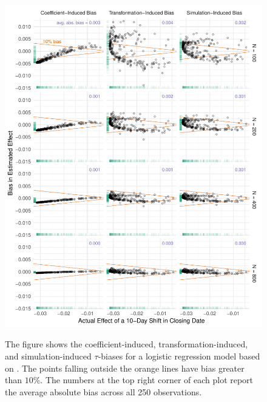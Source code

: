 \documentclass[11pt]{article}
\begin{document}
\begin{figure}[h!]
\begin{center}
\includegraphics[scale = 0.75]{figs/nagler-fd-bias.pdf}\\
\vspace{.1in}
\caption{The figure shows the coefficient-induced, transformation-induced, and simulation-induced $\tau$-biases for a logistic regression model based on \cite{BerryDeMerittEsarey2010}.
The points falling outside the orange lines have bias greater than $10\%$.
The numbers at the top right corner of each plot report the average absolute bias across all 250 observations.}\label{fig:nagler}
\end{center}
\end{figure}
\end{document}
